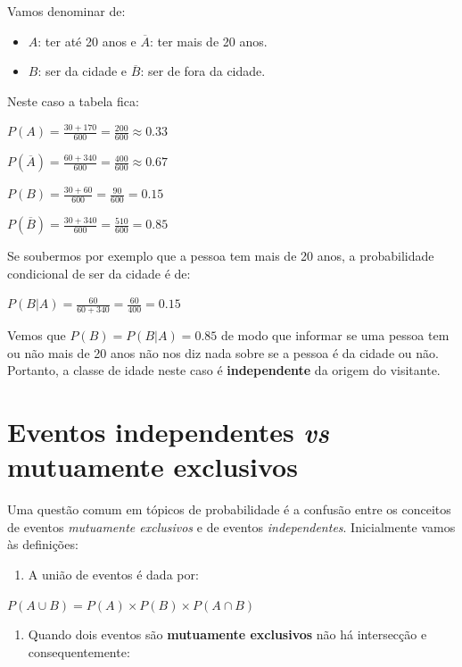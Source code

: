 \documentclass[
]{book}
\providecommand{\tightlist}{%
  \setlength{\itemsep}{0pt}\setlength{\parskip}{0pt}}
\begin{document}
Vamos denominar de:

\begin{itemize}
\item
  \(A\): ter até 20 anos e \(\overline{A}\): ter mais de 20 anos.
\item
  \(B\): ser da cidade e \(\overline{B}\): ser de fora da cidade.
\end{itemize}

Neste caso a tabela fica:

\(P(A) = \frac{30 + 170}{600} = \frac{200}{600} \approx 0.33\)

\(P(\overline{A}) = \frac{60 + 340}{600} = \frac{400}{600} \approx 0.67\)

\(P(B) = \frac{30 + 60}{600} = \frac{90}{600} = 0.15\)

\(P(\overline{B}) = \frac{30 + 340}{600} = \frac{510}{600} = 0.85\)

Se soubermos por exemplo que a pessoa tem mais de 20 anos, a probabilidade condicional de ser da cidade é de:

\(P(B|A) = \frac{60}{60 + 340} = \frac{60}{400} = 0.15\)

Vemos que \(P(B) = P(B|A) = 0.85\) de modo que informar se uma pessoa tem ou não mais de 20 anos não nos diz nada sobre se a pessoa é da cidade ou não. Portanto, a classe de idade neste caso é \textbf{independente} da origem do visitante.

\hypertarget{eventos-independentes-vs-mutuamente-exclusivos}{%
\section{\texorpdfstring{Eventos independentes \emph{vs} mutuamente exclusivos}{Eventos independentes vs mutuamente exclusivos}}\label{eventos-independentes-vs-mutuamente-exclusivos}}

Uma questão comum em tópicos de probabilidade é a confusão entre os conceitos de eventos \emph{mutuamente exclusivos} e de eventos \emph{independentes}. Inicialmente vamos às definições:

\begin{enumerate}
\def\labelenumi{\arabic{enumi}.}
\tightlist
\item
  A união de eventos é dada por:
\end{enumerate}

\(P(A \cup B) = P(A) \times P(B) \times P(A \cap B)\)

\begin{enumerate}
\def\labelenumi{\arabic{enumi}.}
\setcounter{enumi}{1}
\tightlist
\item
  Quando dois eventos são \textbf{mutuamente exclusivos} não há intersecção e consequentemente:
\end{enumerate}
\end{document}
